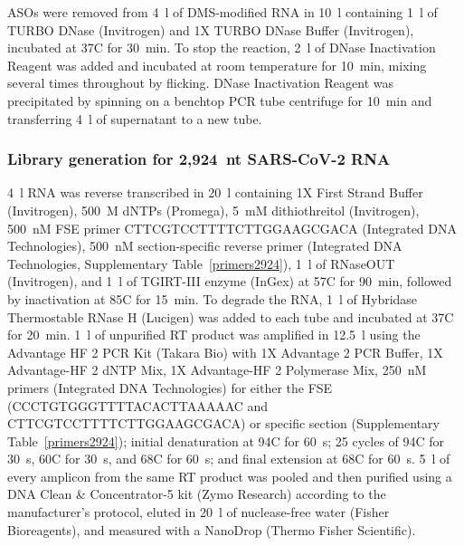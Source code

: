 \documentclass[main.tex]{subfiles}
\begin{document}
ASOs were removed from 4~\textmu l of DMS-modified RNA in 10~\textmu l containing 1~\textmu l of TURBO DNase (Invitrogen) and 1X TURBO DNase Buffer (Invitrogen), incubated at 37\textdegree C for 30~min.
To stop the reaction, 2~\textmu l of DNase Inactivation Reagent was added and incubated at room temperature for 10~min, mixing several times throughout by flicking.
DNase Inactivation Reagent was precipitated by spinning on a benchtop PCR tube centrifuge for 10~min and transferring 4~\textmu l of supernatant to a new tube.

\subsubsection{Library generation for 2,924~nt SARS-CoV-2 RNA}

4~\textmu l RNA was reverse transcribed in 20~\textmu l containing 1X First Strand Buffer (Invitrogen), 500~\textmu M dNTPs (Promega), 5~mM dithiothreitol (Invitrogen), 500~nM FSE primer CTTCGTCCTTTTCTTGGAAGCGACA (Integrated DNA Technologies), 500~nM section-specific reverse primer (Integrated DNA Technologies, Supplementary Table~\ref{primers2924}), 1~\textmu l of RNaseOUT (Invitrogen), and 1~\textmu l of TGIRT-III enzyme (InGex) at 57\textdegree C for 90~min, followed by inactivation at 85\textdegree C for 15~min.
To degrade the RNA, 1~\textmu l of Hybridase Thermostable RNase H (Lucigen) was added to each tube and incubated at 37\textdegree C for 20~min.
1~\textmu l of unpurified RT product was amplified in 12.5~\textmu l using the Advantage HF 2 PCR Kit (Takara Bio) with 1X Advantage 2 PCR Buffer, 1X Advantage-HF 2 dNTP Mix, 1X Advantage-HF 2 Polymerase Mix, 250~nM primers (Integrated DNA Technologies) for either the FSE (CCCTGTGGGTTTTACACTTAAAAAC and CTTCGTCCTTTTCTTGGAAGCGACA) or specific section (Supplementary Table~\ref{primers2924}); initial denaturation at 94\textdegree C for 60~s; 25 cycles of 94\textdegree C for 30~s, 60\textdegree C for 30~s, and 68\textdegree C for 60~s; and final extension at 68\textdegree C for 60~s.
5~\textmu l of every amplicon from the same RT product was pooled and then purified using a DNA Clean \& Concentrator-5 kit (Zymo Research) according to the manufacturer's protocol, eluted in 20~\textmu l of nuclease-free water (Fisher Bioreagents), and measured with a NanoDrop (Thermo Fisher Scientific).
\end{document}
